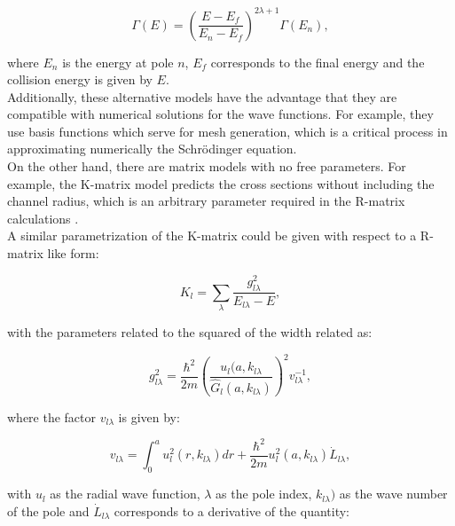 \documentclass[openany]{book}
\begin{document}
 \begin{equation}\label{rmatrix_radiativeCapture_width_E}
	\Gamma(E) = \left( \frac{E - E_f}{E_n - E_f} \right)^{2\lambda + 1} \Gamma(E_n),
\end{equation}

where $E_n$ is the energy at pole $n$, $E_f$ corresponds to the final energy and the collision energy is given by $E$. \\

Additionally, these alternative models have the advantage that they are compatible with numerical solutions for the wave functions. For example, they use basis functions which serve for mesh generation, which is a critical process in approximating numerically the Schrödinger equation. \\

On the other hand, there are matrix models with no free parameters. For example, the K-matrix model predicts the cross sections without including the channel radius, which is an arbitrary parameter required in the R-matrix calculations \cite{humblet_1990}. \\

A similar parametrization of the K-matrix could be given with respect to a R-matrix like form: 

\begin{equation}\label{eq:rmatrix_kmatrix_series}
	K_l =  \sum_\lambda { \frac{g^2_{l\lambda}}{E_{l\lambda} - E}},
\end{equation}

with the parameters related to the squared of the width related as: 

\begin{equation}\label{eq:rmatrix_kmatrix_g}
	g^2_{l\lambda} = \frac{\hbar^2}{2m} \left(\frac{u_l(a, k_{l\lambda}}{\hat G_l (a, k_{
			l\lambda})}  \right)^2 v^{-1}_{l\lambda},
\end{equation}

where the factor $v_{l\lambda}$ is given by:

\begin{equation}\label{eq:rmatrix_kmatrix_v}
	v_{l\lambda} = \int_0^{a} u^2_l(r, k_{l\lambda}) dr  + \frac{\hbar^2}{2m} u^2_l(a,  k_{l\lambda}) \dot {L}_{l\lambda},
\end{equation}

with $u_l$ as the radial wave function, $\lambda$ as the pole index, $k_{l\lambda})$ as the wave number of the pole and $\dot {L}_{l\lambda}$ corresponds to a derivative of the quantity:
\end{document}
